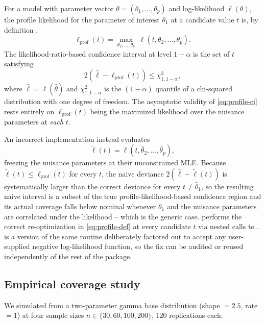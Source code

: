 \documentclass[article]{jss}
\begin{document}
For a model with parameter vector $\theta=(\theta_1,\dots,\theta_p)$ and log-likelihood $\ell(\theta)$, the profile likelihood for the parameter of interest $\theta_1$ at a candidate value $t$ is, by definition \citep{severini2000,murphyvandervaart2000},
\begin{equation}
  \ell_{\mathrm{prof}}(t) = \max_{\theta_2,\dots,\theta_p} \; \ell(t,\theta_2,\dots,\theta_p).
  \label{eq:profile-def}
\end{equation}
The likelihood-ratio-based confidence interval at level $1-\alpha$ is the set of $t$ satisfying
\begin{equation}
  2\left(\hat\ell - \ell_{\mathrm{prof}}(t)\right) \le \chi^2_{1,1-\alpha},
  \label{eq:profile-ci}
\end{equation}
where $\hat\ell = \ell(\hat\theta)$ and $\chi^2_{1,1-\alpha}$ is the $(1-\alpha)$ quantile of a chi-squared distribution with one degree of freedom. The asymptotic validity of \eqref{eq:profile-ci} rests entirely on $\ell_{\mathrm{prof}}(t)$ being the maximized likelihood over the nuisance parameters at \emph{each} $t$.

An incorrect implementation instead evaluates
\begin{equation}
  \tilde\ell(t) = \ell(t,\hat\theta_2,\dots,\hat\theta_p),
  \label{eq:naive-wrong}
\end{equation}
freezing the nuisance parameters at their unconstrained MLE. Because $\tilde\ell(t) \le \ell_{\mathrm{prof}}(t)$ for every $t$, the naive deviance $2(\hat\ell-\tilde\ell(t))$ is systematically larger than the correct deviance for every $t \ne \hat\theta_1$, so the resulting naive interval is a subset of the true profile-likelihood-based confidence region and its actual coverage falls below nominal whenever $\theta_1$ and the nuisance parameters are correlated under the likelihood -- which is the generic case.  performs the correct re-optimization in \eqref{eq:profile-def} at every candidate $t$ via nested calls to .  is a version of the same routine deliberately factored out to accept any user-supplied negative log-likelihood function, so the fix can be audited or reused independently of the rest of the package.

\subsection{Empirical coverage study}

We simulated from a two-parameter gamma base distribution (shape $=2.5$, rate $=1$) at four sample sizes $n \in \{30,60,100,200\}$, 120 replications each:
\end{document}

